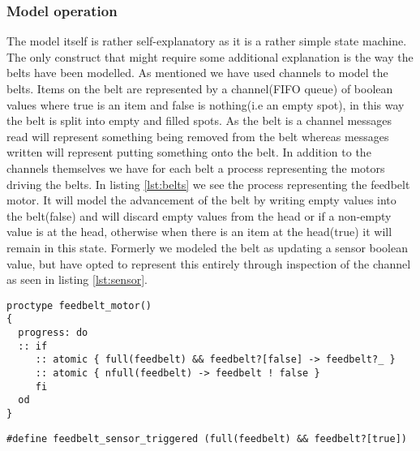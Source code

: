 \documentclass[12pt]{article}
\begin{document}
\subsubsection*{Model operation}
The model itself is rather self-explanatory as it is a rather simple state machine. The only construct that
might require some additional explanation is the way the belts have been modelled. As mentioned we have used
channels to model the belts. Items on the belt are represented by a channel(FIFO queue) of boolean values where true is
an item and false is nothing(i.e an empty spot), in this way the belt is split into empty and filled spots. As the belt is a
channel messages read will represent something being removed from the belt whereas messages written will represent putting
something onto the belt. In addition to the channels themselves we have for each belt a process representing
the motors driving the belts. In listing \ref{lst:belts} we see the process representing the feedbelt motor. It will
model the advancement of the belt by writing empty values into the belt(false) and will discard empty values from
the head or if a non-empty value is at the head, otherwise when there is an item at the head(true) it will
remain in this state. Formerly we modeled the belt as updating a sensor boolean value, but have opted to represent
this entirely through inspection of the channel as seen in listing \ref{lst:sensor}.
\begin{lstlisting}[caption={Belts},label={lst:belts}]
proctype feedbelt_motor()
{
  progress: do
  :: if
     :: atomic { full(feedbelt) && feedbelt?[false] -> feedbelt?_ }
     :: atomic { nfull(feedbelt) -> feedbelt ! false }   
     fi
  od
}
\end{lstlisting}

\begin{lstlisting}[caption={belt sensor},label={lst:sensor}]
#define feedbelt_sensor_triggered (full(feedbelt) && feedbelt?[true])
\end{lstlisting}
\end{document}
